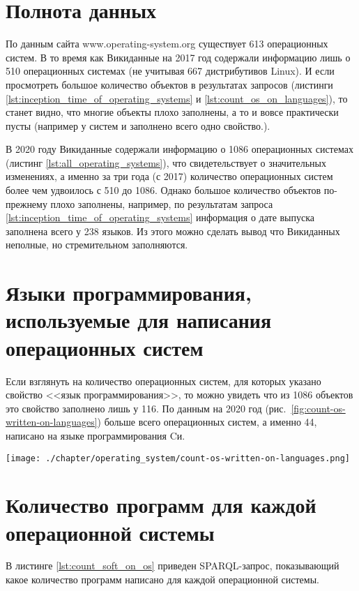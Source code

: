 \section{Полнота данных}
По данным сайта www.operating-system.org существует 613 операционных систем\cite{list_operating_systems}. В то время как Викиданные на 2017 год содержали информацию лишь о 510 операционных системах (не учитывая \num{667} дистрибутивов Linux\cite{list_operating_systems}). И если просмотреть большое количество объектов в результатах запросов (листинги \ref{lst:inception_time_of_operating_systems} и \ref{lst:count_os_on_languages}), то станет видно, что многие объекты плохо заполнены, а то и вовсе практически пусты (например у систем  и  заполнено всего одно свойство\cite{prowd_os_link}.).

В 2020 году Викиданные содержали информацию о 1086 операционных системах (листинг \ref{lst:all_operating_systems}), что свидетельствует о значительных изменениях, а именно за три года (с 2017) количество операционных систем более чем удвоилось с 510 до 1086. Однако большое количество объектов по-прежнему плохо заполнены, например, по результатам запроса \ref{lst:inception_time_of_operating_systems} информация о дате выпуска заполнена всего у \num{238} языков. Из этого можно сделать вывод что Викиданных неполные, но стремительном заполняются.

\section{Языки программирования, используемые для написания операционных систем}
Если взглянуть на количество операционных систем, для которых указано свойство <<язык программирования>>, то можно увидеть что из \num{1086} объектов это свойство заполнено лишь у \num{116}. По данным на 2020 год (рис.~\ref{fig:count-os-written-on-languages}) больше всего операционных систем, а именно 44, написано на языке программирования Cи.

\begin{figure*}[h!]
	\texttt{[image: ./chapter/operating\_system/count-os-written-on-languages.png]}
	\caption{Первые восемь языков, на которых написано больше всего операционных систем, 2020 год}
	\label{fig:count-os-written-on-languages}
\end{figure*}


\section{Количество программ для каждой операционной системы}
В листинге \ref{lst:count_soft_on_os} приведен SPARQL-запрос, показывающий какое количество программ написано для каждой операционной системы.

